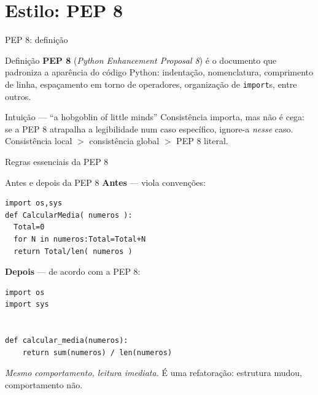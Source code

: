 \documentclass[aspectratio=169]{beamer}
\begin{document}
\section{Estilo: PEP 8}

\begin{frame}{PEP 8: definição}
  \begin{block}{Definição}
    \textbf{PEP 8} (\emph{Python Enhancement Proposal 8}) é o documento
    que padroniza a aparência do código Python: indentação,
    nomenclatura, comprimento de linha, espaçamento em torno de
    operadores, organização de \texttt{import}s, entre outros.
  \end{block}
  \begin{exampleblock}{Intuição --- ``a hobgoblin of little minds''}
    Consistência importa, mas não é cega: se a PEP 8 atrapalha
    a legibilidade num caso específico, ignore-a \emph{nesse} caso.
    Consistência local $>$ consistência global $>$ PEP 8 literal.
  \end{exampleblock}
\end{frame}

\begin{frame}{Regras essenciais da PEP 8}
  \begin{center}
  \end{center}
\end{frame}

\begin{frame}[fragile]{Antes e depois da PEP 8}
\textbf{Antes} --- viola convenções:
\begin{lstlisting}
import os,sys
def CalcularMedia( numeros ):
  Total=0
  for N in numeros:Total=Total+N
  return Total/len( numeros )
\end{lstlisting}
\textbf{Depois} --- de acordo com a PEP 8:
\begin{lstlisting}
import os
import sys


def calcular_media(numeros):
    return sum(numeros) / len(numeros)
\end{lstlisting}
\footnotesize\emph{Mesmo comportamento, leitura imediata.} É uma refatoração:
estrutura mudou, comportamento não.
\end{frame}
\end{document}
